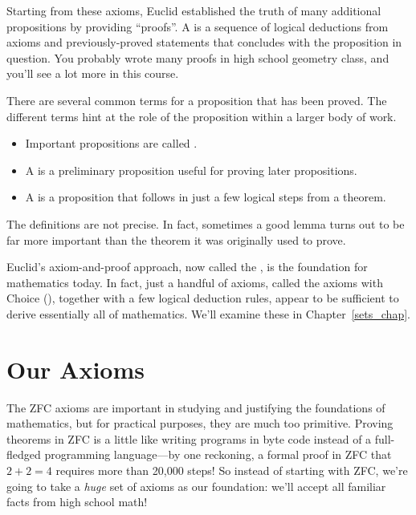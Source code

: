 Starting from these axioms, Euclid established the truth of many
additional propositions by providing ``proofs''.  A  is a
sequence of logical deductions from axioms and previously-proved
statements that concludes with the proposition in question.  You
probably wrote many proofs in high school geometry class, and you'll
see a lot more in this course.

There are several common terms for a proposition that has been proved.
The different terms hint at the role of the proposition within a
larger body of work.
%
\begin{itemize}
\item Important propositions are called .
\item A  is a preliminary proposition useful for proving
later propositions.
\item A  is a proposition that follows
in just a few logical steps from a theorem.  
\end{itemize}
%
The definitions are not precise.  In fact, sometimes a good lemma
turns out to be far more important than the theorem it was originally
used to prove.

Euclid's axiom-and-proof approach, now called the , is the foundation for mathematics today.  In fact, just a
handful of axioms, called the axioms  with Choice
(), together with a few logical deduction rules, appear to
be sufficient to derive essentially all of mathematics.  We'll examine
these in Chapter~\ref{sets_chap}.


\section{Our Axioms}

The ZFC axioms are important in studying and justifying the foundations of
mathematics, but for practical purposes, they are much too primitive.
Proving theorems in ZFC is a little like writing programs in byte code
instead of a full-fledged programming language---by one reckoning, a
formal proof in ZFC that $2 + 2 = 4$ requires more than 20,000 steps!  So
instead of starting with ZFC, we're going to take a \textit{huge} set of
axioms as our foundation: we'll accept all familiar facts from high school
math!

